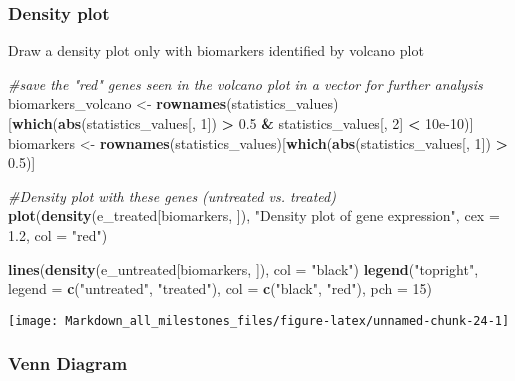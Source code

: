 \documentclass[]{article}
\newenvironment{Shaded}{\begin{snugshade}}{\end{snugshade}}
\newcommand{\CommentTok}[1]{\textcolor[rgb]{0.56,0.35,0.01}{\textit{#1}}}
\newcommand{\DataTypeTok}[1]{\textcolor[rgb]{0.13,0.29,0.53}{#1}}
\newcommand{\DecValTok}[1]{\textcolor[rgb]{0.00,0.00,0.81}{#1}}
\newcommand{\FloatTok}[1]{\textcolor[rgb]{0.00,0.00,0.81}{#1}}
\newcommand{\KeywordTok}[1]{\textcolor[rgb]{0.13,0.29,0.53}{\textbf{#1}}}
\newcommand{\NormalTok}[1]{#1}
\newcommand{\OperatorTok}[1]{\textcolor[rgb]{0.81,0.36,0.00}{\textbf{#1}}}
\newcommand{\StringTok}[1]{\textcolor[rgb]{0.31,0.60,0.02}{#1}}
\begin{document}
\hypertarget{density-plot-1}{%
\subsubsection{Density plot}\label{density-plot-1}}

Draw a density plot only with biomarkers identified by volcano plot

\begin{Shaded}
\begin{Highlighting}[]
\CommentTok{#save the "red" genes seen in the volcano plot in a vector for further analysis}
\NormalTok{biomarkers_volcano <-}\StringTok{ }\KeywordTok{rownames}\NormalTok{(statistics_values)[}\KeywordTok{which}\NormalTok{(}\KeywordTok{abs}\NormalTok{(statistics_values[, }\DecValTok{1}\NormalTok{]) }\OperatorTok{>}\StringTok{ }\FloatTok{0.5} 
                                                   \OperatorTok{&}\StringTok{ }\NormalTok{statistics_values[, }\DecValTok{2}\NormalTok{] }\OperatorTok{<}\StringTok{ }\FloatTok{10e-10}\NormalTok{)]}
\NormalTok{biomarkers <-}\StringTok{ }\KeywordTok{rownames}\NormalTok{(statistics_values)[}\KeywordTok{which}\NormalTok{(}\KeywordTok{abs}\NormalTok{(statistics_values[, }\DecValTok{1}\NormalTok{]) }\OperatorTok{>}\StringTok{ }\FloatTok{0.5}\NormalTok{)]}

\CommentTok{#Density plot with these genes (untreated vs. treated)}
\KeywordTok{plot}\NormalTok{(}\KeywordTok{density}\NormalTok{(e_treated[biomarkers, ]), }\StringTok{"Density plot of gene expression"}\NormalTok{, }\DataTypeTok{cex =} \FloatTok{1.2}\NormalTok{, }\DataTypeTok{col =} \StringTok{"red"}\NormalTok{)}

\KeywordTok{lines}\NormalTok{(}\KeywordTok{density}\NormalTok{(e_untreated[biomarkers, ]), }\DataTypeTok{col =} \StringTok{"black"}\NormalTok{)}
\KeywordTok{legend}\NormalTok{(}\StringTok{"topright"}\NormalTok{, }\DataTypeTok{legend =} \KeywordTok{c}\NormalTok{(}\StringTok{"untreated"}\NormalTok{, }\StringTok{"treated"}\NormalTok{), }\DataTypeTok{col =} \KeywordTok{c}\NormalTok{(}\StringTok{"black"}\NormalTok{, }\StringTok{"red"}\NormalTok{), }\DataTypeTok{pch =} \DecValTok{15}\NormalTok{)}
\end{Highlighting}
\end{Shaded}

\begin{center}\texttt{[image: Markdown\_all\_milestones\_files/figure-latex/unnamed-chunk-24-1]} \end{center}

\hypertarget{venn-diagram}{%
\subsubsection{Venn Diagram}\label{venn-diagram}}
\end{document}
